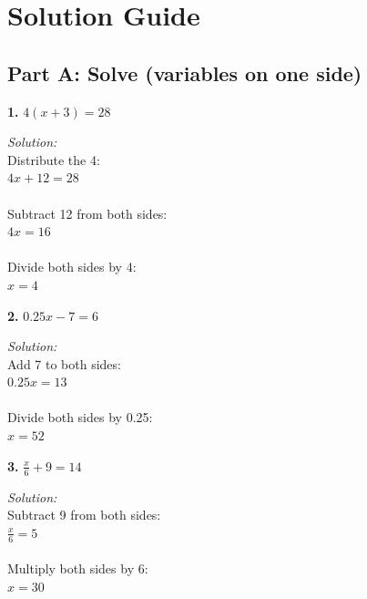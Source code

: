 \documentclass[12pt]{article}
\begin{document}
    \section*{Solution Guide}

        \subsection*{Part A: Solve (variables on one side)}

            \textbf{1.} $4(x + 3) = 28$

                \textit{Solution:}\\
                Distribute the 4:\\
                $4x + 12 = 28$\\
                \\
                Subtract 12 from both sides:\\
                $4x = 16$\\
                \\
                Divide both sides by 4:\\
                $x = 4$


                \vspace{0.5cm}

            \textbf{2.} $0.25x - 7 = 6$

                \textit{Solution:}\\
                Add 7 to both sides:\\
                $0.25x = 13$\\
                \\
                Divide both sides by 0.25:\\
                $x = 52$


                \vspace{0.5cm}

            \textbf{3.} $\frac{x}{6} + 9 = 14$

                \textit{Solution:}\\
                Subtract 9 from both sides:\\
                $\frac{x}{6} = 5$\\
                \\
                Multiply both sides by 6:\\
                $x = 30$
\end{document}

